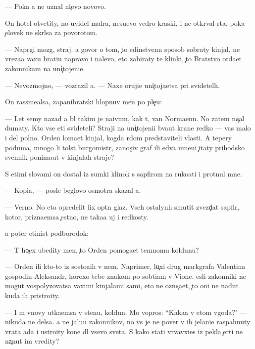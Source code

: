 \documentclass[10pt]{book}
\begin{document}
— Poka {\y}a ne uznal ni{\c}evo novovo.

On hotel otvetity, no uvidel mal{\ia}ra, nesu{\x}evo vedro kraski, i ne otkr{\yi}val rta, poka {\c}elovek ne skr{\yi}lsa za povorotom.

— Napr{\ia}gi mozg, straj. {\Y}a govor{\iu} o tom, {\c}to {\y}edinstvenn{\yi}{\y} sposob sobraty kinjal{\yi}, ne v{\yi}reza{\y}a vaxu brati{\y}u napravo i nalevo, eto zabiraty te klinki, {\c}to Bratstvo otda{\y}et zakonnikam na uni{\c}tojeni{\y}e.

— Nevozmojno, — vozrazil {\y}a. — Naxe oruji{\y}e uni{\c}toja{\y}etsa pri svidetel{\ia}h.

On rassme{\y}alsa, zapanibratski hlopnuv men{\ia} po ple{\c}u:

— Let semy nazad {\y}a b{\yi}l takim je na{\y}ivn{\yi}m, kak t{\yi}, van Norma{\y}enn. No zatem na{\c}al dumaty. Kto vse eti svideteli? Straji na uni{\c}tojeni{\y}i b{\yi}va{\y}ut kra{\y}ne redko — vas malo i del polno. Orden loma{\y}et kinjal, kogda r{\ia}dom predstaviteli vlasti. A tepery poduma{\y}, mnogo li tolst{\yi}{\y} burgomistr, zanos{\c}iv{\yi}{\y} graf ili {\y}edva ume{\y}u{\x}i{\y} {\c}itaty prihodsko{\y} sv{\ia}{\x}ennik ponima{\y}ut v kinjalah straje{\y}?

S etimi slovami on dostal iz sumki klinok s sapfirom na ruko{\y}ati i prot{\ia}nul mne.

— Kopi{\y}a, — posle beglovo osmotra skazal {\y}a.

— Verno. No eto opredelit lix op{\yi}tn{\yi}{\y} glaz. Vseh ostalyn{\yi}h smutit zvezd{\c}at{\yi}{\y} sapfir, kotor{\yi}{\y}, prizna{\y}emsa {\c}estno, ne taka{\y}a uj i redkosty.

{\Y}a poter {\x}etinist{\yi}{\y} podborodok:

— T{\yi} ho{\c}ex ubedity men{\ia}, {\c}to Orden pomoga{\y}et temnomu koldunu?

— Orden ili kto-to iz sosto{\y}a{\x}ih v nem. Naprimer, lu{\c}xi{\y} drug markgrafa Valentina gospodin Aleksandr, horoxo tebe znakom{\yi}{\y} po sob{\yi}ti{\y}am v Vione. {\Y}esli zakonniki ne mogut vospolyzovatsa vaximi kinjalami sami, eto ne ozna{\c}a{\y}et, {\c}to oni ne na{\y}dut kuda ih pristro{\y}ity.

— I m{\yi} vnovy ut{\yi}ka{\y}emsa v stenu, koldun. Mo{\y} vopros: ``Kaka{\y}a v etom v{\yi}goda?" — nikuda ne delsa. {\Y}a ne jalu{\y}u zakonnikov, no vs{\e} je ne pover{\iu} v ih jelani{\y}e raspahnuty vrata ada i ustro{\y}ity kone{\q} dl{\ia} vsevo sveta. S kako{\y} stati v{\yi}rvavxi{\y}es{\ia} iz pekla {\c}erti ne na{\c}nut im vredity?
\end{document}
